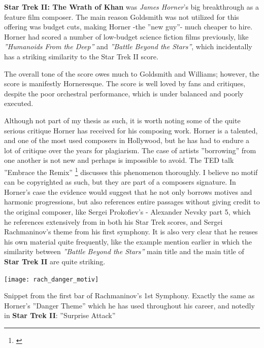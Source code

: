 \textbf{Star Trek II: The Wrath of Khan} was \textit{James Horner}'s big breakthrough as a feature film composer. The main reason Goldsmith was not utilized for this offering was budget cuts, making Horner -the ''new guy''- much cheaper to hire. Horner had scored a number of low-budget science fiction films previously, like \textit{''Humanoids From the Deep''} and \textit{''Battle Beyond the Stars''}, which incidentally has a striking similarity to the Star Trek II score.

The overall tone of the score owes much to Goldsmith and Williams; however, the score is manifestly Horneresque. The score is well loved by fans and critiques, despite the poor orchestral performance, which is under balanced and poorly executed.

Although not part of my thesis as such, it is worth noting some of the quite serious critique Horner has received for his composing work. Horner is a talented, and one of the most used composers in Hollywood, but he has had to endure a lot of critique over the years for plagiarism. The case of artists ''borrowing'' from one another is not new and perhaps is impossible to avoid. The TED talk ''Embrace the Remix'' \footnote{\citealt{ferguson_embrace_2012}} discusses this phenomenon thoroughly. I believe no motif can be copyrighted as such, but they are part of a composers signature. In Horner's case the evidence would suggest that he not only borrows motives and harmonic progressions, but also references entire passages without giving credit to the original composer, like Sergei Prokofiev's - Alexander Nevsky part 5, which he references extensively from in both his Star Trek scores, and Sergei Rachmaninov's theme from his first symphony. It is also very clear that he reuses his own material quite frequently, like the example mention earlier in which the similarity between \textit{''Battle Beyond the Stars''} main title and the main title of \textbf{Star Trek II} are quite striking.

\begin{marginfigure}
\center
\texttt{[image: rach\_danger\_motiv]}
	\caption{Snippet from the first bar of Rachmaninov's 1st Symphony. Exactly the same as Horner's ''Danger Theme'' which he has used throughout his career, and notedly in \textbf{Star Trek II}: ''Surprise Attack''}
	\label{fg:danger theme}
\end{marginfigure}

